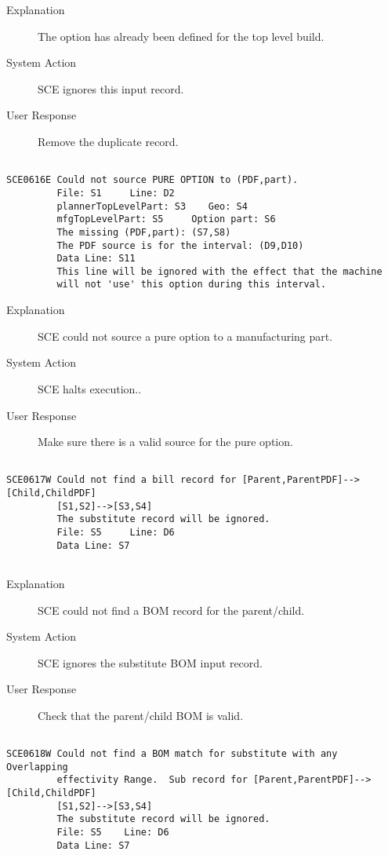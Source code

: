 \begin{description}
\item[Explanation]  The option has already been defined for the top level build.

\item[System Action]  SCE ignores this input record.

\item[User Response]  Remove the duplicate record.
\end{description}
\hrulefill
\begin{verbatim}

SCE0616E Could not source PURE OPTION to (PDF,part).
         File: S1     Line: D2
         plannerTopLevelPart: S3    Geo: S4
         mfgTopLevelPart: S5     Option part: S6
         The missing (PDF,part): (S7,S8)
         The PDF source is for the interval: (D9,D10)
         Data Line: S11
         This line will be ignored with the effect that the machine
         will not 'use' this option during this interval.
\end{verbatim}
\begin{description}
\item[Explanation]  SCE could not source a pure option to a manufacturing part.

\item[System Action]  SCE halts execution..

\item[User Response]  Make sure there is a valid source for the pure option.
\end{description}
\hrulefill
\begin{verbatim}

SCE0617W Could not find a bill record for [Parent,ParentPDF]-->[Child,ChildPDF]
         [S1,S2]-->[S3,S4]
         The substitute record will be ignored.
         File: S5     Line: D6
         Data Line: S7
         
\end{verbatim}
\begin{description}
\item[Explanation]  SCE could not find a BOM record for the parent/child.

\item[System Action]  SCE ignores the substitute BOM input record.

\item[User Response]  Check that the parent/child BOM is valid.
\end{description}
\hrulefill
\begin{verbatim}

SCE0618W Could not find a BOM match for substitute with any Overlapping
         effectivity Range.  Sub record for [Parent,ParentPDF]-->[Child,ChildPDF]
         [S1,S2]-->[S3,S4]
         The substitute record will be ignored.
         File: S5    Line: D6
         Data Line: S7
         
\end{verbatim}
